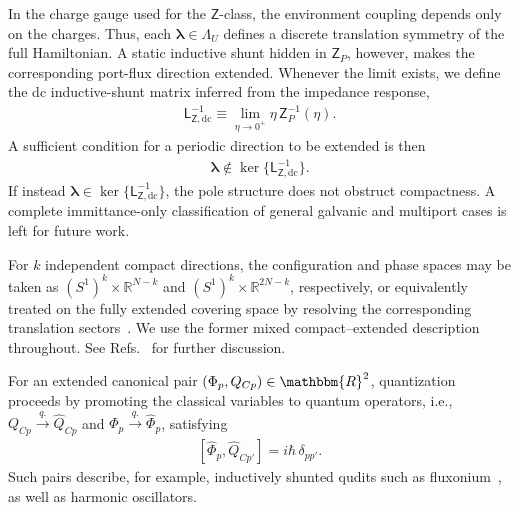 \documentclass[prx,aps,twocolumn,article]{revtex4-2}
\newcommand{\msf}[1]{\mathsf{#1}}
\newcommand{\msZ}{\msf{Z}}
\newcommand{\msL}{\msf{L}}
\begin{document}
In the charge gauge used for the $\msZ$-class, the environment coupling
depends only on the charges. Thus, each
$\boldsymbol{\lambda}\in\Lambda_U$ defines a discrete translation symmetry
of the full Hamiltonian. A static inductive shunt hidden in $\msZ_P$,
however, makes the corresponding port-flux direction extended. Whenever the limit exists, we define the dc inductive-shunt matrix inferred
from the impedance response,
\begin{align}
    \msL_{\msZ,\mathrm{dc}}^{-1}
    \equiv
    \lim_{\eta\to0^+}\eta\,\msZ_P^{-1}(\eta).
    \label{Eq:ZDCInductiveMatrix}
\end{align}
A sufficient condition for a periodic direction to be extended is then
\begin{align}
    \boldsymbol{\lambda}
    \notin
    \ker\{\msL_{\msZ,\mathrm{dc}}^{-1}\}.
    \label{Eq:ZExtendedDirectionCriterion}
\end{align}
If instead
$\boldsymbol{\lambda}\in\ker\{\msL_{\msZ,\mathrm{dc}}^{-1}\}$, the pole
structure does not obstruct compactness. A complete immittance-only
classification of general galvanic and multiport cases is left for future
work.

For $k$ independent compact directions, the configuration and phase spaces may be taken as $(S^1)^k\times\mathbb{R}^{N-k}$ and $(S^1)^k\times\mathbb{R}^{2N-k}$, respectively, or equivalently treated on the fully extended covering space by resolving the corresponding translation sectors~\cite{ParraRodriguez:2024}. We use the former mixed compact--extended description throughout. See
Refs.~\cite{Averin:1985,Apenko:1989,Schoen:1990,Koch:2009,
Devoret:2021,ThanhLe:2020,ParraRodriguez:2024,Giacomelli:2026}
for further discussion.

For an extended canonical pair $(\Phi_p,Q_{Cp})\in\mathbbm{R}^2$,
quantization proceeds by promoting the classical variables to quantum
operators, i.e.,
$Q_{Cp}\overset{q.}{\rightarrow}\hat{Q}_{Cp}$ and
$\Phi_p\overset{q.}{\rightarrow}\hat{\Phi}_p$, satisfying
\begin{align}
    \left[\hat{\Phi}_p,\hat{Q}_{Cp'}\right]
    =
    i\hbar\,\delta_{pp'}.
\end{align}
Such pairs describe, for example, inductively shunted qudits such as
fluxonium~\cite{Manucharyan:2009}, as well as harmonic oscillators.
\end{document}
